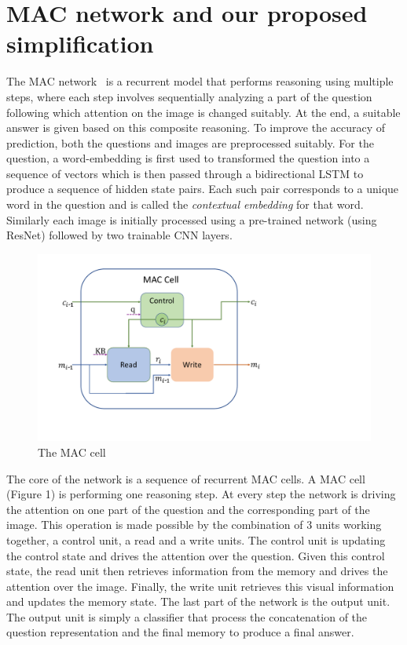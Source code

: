 \section{MAC network and our proposed simplification}

The MAC network~\cite{hudsonManning18} is a recurrent model that performs reasoning 
using multiple steps, where each step involves sequentially analyzing a part of the question following which attention on the image is changed suitably.
At the end, a suitable answer is given based on this composite reasoning.
To improve the accuracy of prediction, both the questions and images
are preprocessed suitably. For the question,  a word-embedding is first used to
transformed the question into a sequence of vectors which is then passed through
a bidirectional LSTM to produce a sequence of hidden state pairs. Each such pair 
corresponds to a unique word in the question and is called the 
\emph{contextual embedding} for that word.
Similarly each image is initially processed using a pre-trained network (using ResNet) followed by two trainable CNN layers.


\begin{figure}
	\vspace{-15pt}
	\centering
	\includegraphics[width=\textwidth]{img/mac_cell.pdf}
	\caption{The MAC cell~\cite{hudsonManning18}}
	\label{fig:mac_cell}
	\vspace{-5pt}
\end{figure}
	
The core of the network is a sequence of recurrent MAC cells. A MAC cell (Figure 1) is performing one reasoning step. At every step the network is driving the attention on one part of the question and the corresponding part of the image. This operation is made possible by the combination of 3 units working together, a control unit, a read and a write units. The control unit is updating the control state and drives the attention over the question. Given this control state, the read unit then retrieves information from the memory and drives the attention over the image.
Finally, the write unit retrieves this visual information and updates the memory state.
The last part of the network is the output unit. The output unit is simply a classifier that process the concatenation of the question representation and the final memory to produce a final answer.

